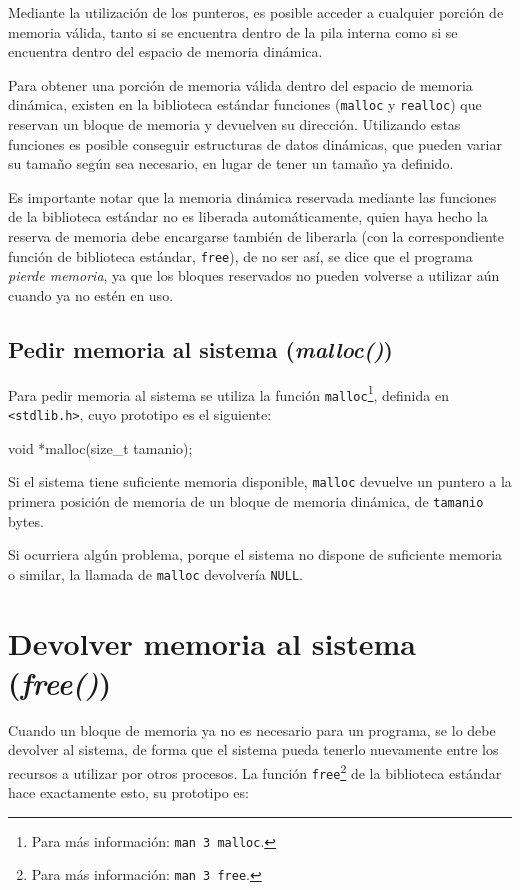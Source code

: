 Mediante la utilización de los punteros, es posible  acceder a cualquier
porción de memoria válida, tanto si se encuentra dentro de la pila interna
como si se encuentra dentro del espacio de memoria dinámica.

Para obtener una porción de memoria válida dentro del espacio de memoria
dinámica, existen en la biblioteca estándar funciones (\lstinline!malloc! y
\lstinline!realloc!) que reservan un bloque de memoria y devuelven su
dirección. Utilizando estas funciones es posible conseguir estructuras de
datos dinámicas, que pueden variar su tamaño según sea necesario, en lugar de
tener un tamaño ya definido.

Es importante notar que la memoria dinámica reservada mediante las funciones
de la biblioteca estándar no es liberada automáticamente, quien haya hecho la
reserva de memoria debe encargarse también de liberarla (con la
correspondiente función de biblioteca estándar, \lstinline!free!), de no ser
así, se dice que el programa \textit{pierde memoria}, ya que los bloques
reservados no pueden volverse a utilizar aún cuando ya no estén en uso.

\subsection{Pedir memoria al sistema (\textit{malloc()})}

Para pedir memoria al sistema se utiliza la función
\lstinline!malloc!\footnote{Para más información: \texttt{man 3 malloc}.},
definida en \lstinline!<stdlib.h>!, cuyo prototipo es el siguiente:

\begin{codigo-c-plano}
void *malloc(size_t tamanio);
\end{codigo-c-plano}

Si el sistema tiene suficiente memoria disponible, \lstinline!malloc! devuelve
un puntero a la primera posición de memoria de un bloque de memoria dinámica,
de \lstinline!tamanio! bytes.

Si ocurriera algún problema, porque el sistema no dispone de suficiente memoria
o similar, la llamada de \lstinline!malloc! devolvería \lstinline!NULL!.

\section{Devolver memoria al sistema (\textit{free()})}

Cuando un bloque de memoria ya no es necesario para un programa, se lo debe
devolver al sistema, de forma que el sistema pueda tenerlo nuevamente entre los
recursos a utilizar por otros procesos. La función
\lstinline!free!\footnote{Para más información: \texttt{man 3 free}.} de la
biblioteca estándar hace exactamente esto, su prototipo es:

